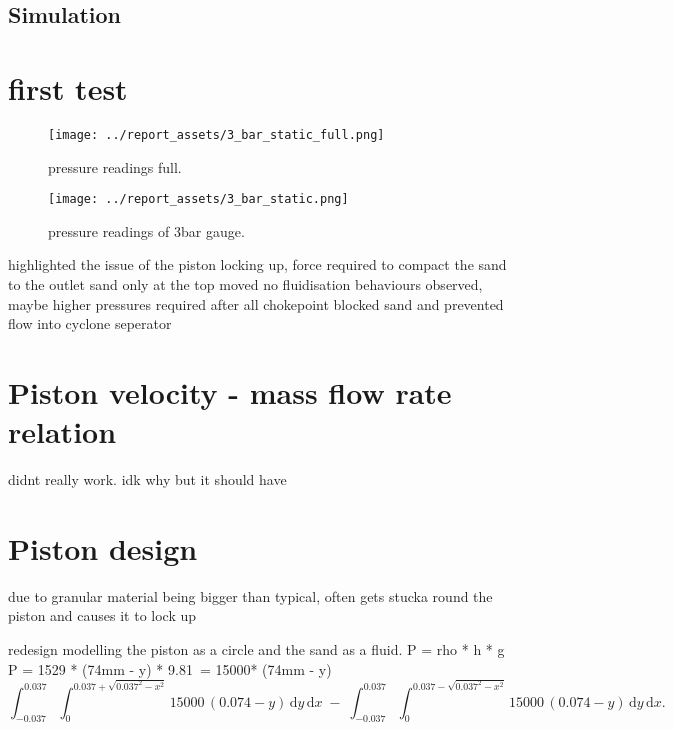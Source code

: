 \subsection{Simulation}

\section{first test}
\begin{figure}[htbp]
    \centering

    \begin{minipage}{0.45\textwidth}
        \centering
        \texttt{[image: ../report\_assets/3\_bar\_static\_full.png]}
        \caption{pressure readings full.}\label{fig:static-pressure-drop-3bar_full}
    \end{minipage}
    \hfill
    \begin{minipage}{0.45\textwidth}
        \centering
        \texttt{[image: ../report\_assets/3\_bar\_static.png]}
        \caption{pressure readings of 3bar gauge.}\label{fig:static-pressure-drop-3bar}
    \end{minipage}

\end{figure}
highlighted the issue of the piston locking up,
force required to compact the sand to the outlet
sand only at the top moved
no fluidisation behaviours observed, maybe higher pressures required after all
chokepoint blocked sand and prevented flow into cyclone seperator
\section{Piston velocity - mass flow rate relation}
didnt really work. idk why but it should have
\section{Piston design}
due to granular material being bigger than typical, often gets stucka round the piston and causes it to lock up

redesign
modelling the piston as a circle and the sand as a fluid. 
P = rho * h * g
P = 1529 * (74mm - y) * 9.81~= 15000* (74mm - y)
\begin{equation}
    \int_{-0.037}^{0.037}\!\int_{0}^{0.037+\sqrt{0.037^2 - x^2}}15000\,(0.074 - y)\,\mathrm{d}y\,\mathrm{d}x
    \;-\;
    \int_{-0.037}^{0.037}\!\int_{0}^{0.037-\sqrt{0.037^2 - x^2}}15000\,(0.074 - y)\,\mathrm{d}y\,\mathrm{d}x.
\end{equation}

